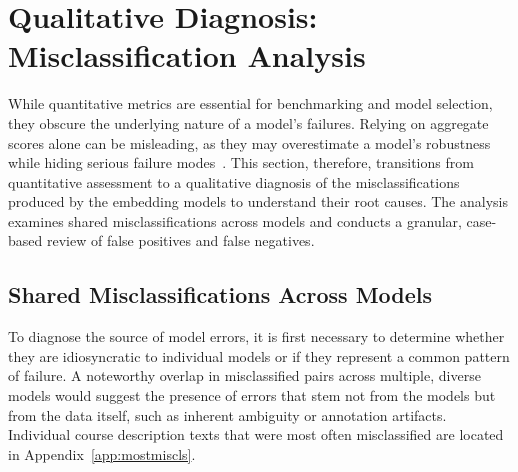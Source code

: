 \section{Qualitative Diagnosis: Misclassification Analysis}\label{ch:4.6}
While quantitative metrics are essential for benchmarking and model selection, they obscure the underlying nature of a model's failures. Relying on aggregate scores alone can be misleading, as they may overestimate a model's robustness while hiding serious failure modes~\cite{gauthier2022}. This section, therefore, transitions from quantitative assessment to a qualitative diagnosis of the misclassifications produced by the embedding models to understand their root causes. The analysis examines shared misclassifications across models and conducts a granular, case-based review of false positives and false negatives.

\subsection{Shared Misclassifications Across Models}\label{ch:4.6.1}
To diagnose the source of model errors, it is first necessary to determine whether they are idiosyncratic to individual models or if they represent a common pattern of failure. A noteworthy overlap in misclassified pairs across multiple, diverse models would suggest the presence of errors that stem not from the models but from the data itself, such as inherent ambiguity or annotation artifacts.  Individual course description texts that were most often misclassified are located in Appendix~\ref{app:mostmiscls}.

